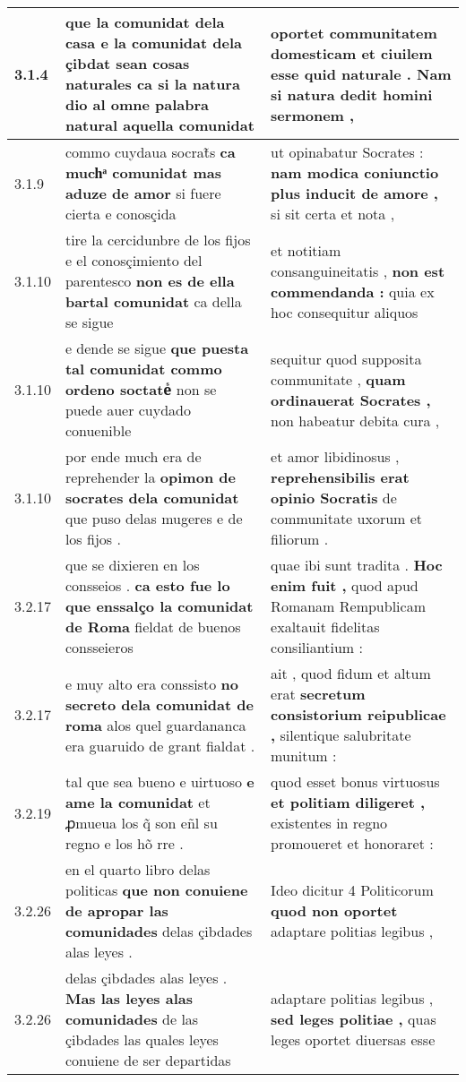 \begin{tabular}{|p{1cm}|p{6.5cm}|p{6.5cm}|}
3.1.4 & que la comunidat dela casa \textbf{ e la comunidat dela çibdat sean cosas naturales } ca si la natura dio al omne palabra natural aquella comunidat & oportet communitatem domesticam \textbf{ et ciuilem esse quid naturale . } Nam si natura dedit homini sermonem , \\\hline
3.1.9 & commo cuydaua socrat̃s \textbf{ ca muchͣ comunidat mas aduze de amor } si fuere cierta e conosçida & ut opinabatur Socrates : \textbf{ nam modica coniunctio plus inducit de amore , } si sit certa et nota , \\\hline
3.1.10 & tire la cercidunbre de los fijos e el conosçimiento del parentesco \textbf{ non es de ella bartal comunidat } ca della se sigue & et notitiam consanguineitatis , \textbf{ non est commendanda : } quia ex hoc consequitur aliquos \\\hline
3.1.10 & e dende se sigue \textbf{ que puesta tal comunidat commo ordeno soctateᷤ } non se puede auer cuydado conuenible & sequitur quod supposita communitate , \textbf{ quam ordinauerat Socrates , } non habeatur debita cura , \\\hline
3.1.10 & por ende much era de reprehender la \textbf{ opimon de socrates dela comunidat } que puso delas mugeres e de los fijos . & et amor libidinosus , \textbf{ reprehensibilis erat opinio Socratis } de communitate uxorum et filiorum . \\\hline
3.2.17 & que se dixieren en los consseios . \textbf{ ca esto fue lo que enssalço la comunidat de Roma } fieldat de buenos consseieros & quae ibi sunt tradita . \textbf{ Hoc enim fuit , } quod apud Romanam Rempublicam exaltauit fidelitas consiliantium : \\\hline
3.2.17 & e muy alto era conssisto \textbf{ no secreto dela comunidat de roma } alos quel guardananca era guaruido de grant fialdat . & ait , quod fidum et altum erat \textbf{ secretum consistorium reipublicae , } silentique salubritate munitum : \\\hline
3.2.19 & tal que sea bueno e uirtuoso \textbf{ e ame la comunidat } et ꝓmueua los q̃ son eñl su regno e los hõ rre . & quod esset bonus virtuosus \textbf{ et politiam diligeret , } existentes in regno promoueret et honoraret : \\\hline
3.2.26 & en el quarto libro delas politicas \textbf{ que non conuiene de apropar las comunidades } delas çibdades alas leyes . & Ideo dicitur 4 Politicorum \textbf{ quod non oportet } adaptare politias legibus , \\\hline
3.2.26 & delas çibdades alas leyes . \textbf{ Mas las leyes alas comunidades } de las çibdades las quales leyes conuiene de ser departidas & adaptare politias legibus , \textbf{ sed leges politiae , } quas leges oportet diuersas esse \\\hline

\end{tabular}
